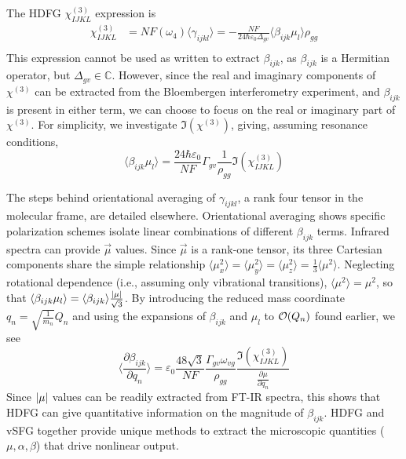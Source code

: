 \documentclass[aip, jcp, reprint, onecolumn]{revtex4-2}
\begin{document}
The HDFG $\chi^{(3)}_{IJKL}$ expression is
\begin{equation}\label{chi3}
\begin{split}
		\chi^{(3)}_{IJKL} &= NF(\omega_4) \langle \gamma_{ijkl} \rangle = -\frac{NF}{24 \hbar \varepsilon_0 \Delta_{gv}} \langle \beta_{ijk} \mu_l \rangle \rho_{gg}\\
\end{split}
\end{equation}
This expression cannot be used as written to extract $\beta_{ijk}$, as $\beta_{ijk}$ is a Hermitian operator, but $\Delta_{gv} \in \mathbb{C}$. 
However, since the real and imaginary components of $\chi^{(3)}$ can be extracted from the Bloembergen interferometry experiment, and $\beta_{ijk}$ is present in either term, we can choose to focus on the real or imaginary part of $\chi^{(3)}$.
For simplicity, we investigate $\Im(\chi^{(3)})$, giving, assuming resonance conditions, 
\begin{equation}
	\langle \beta_{ijk} \mu_{l} \rangle = \frac{24 \hbar \varepsilon_0}{NF} \Gamma_{gv} \frac{1}{\rho_{gg}} \Im(\chi^{(3)}_{IJKL})
\end{equation}

The steps behind orientational averaging of $\gamma_{ijkl}$, a rank four tensor in the molecular frame, are detailed elsewhere.\cite{Andrews1977, McDonnell2024}
Orientational averaging shows specific polarization schemes isolate linear combinations of different $\beta_{ijk}$ terms. 
Infrared spectra can provide $\vec{\mu}$ values.
Since $\vec{\mu}$ is a rank-one tensor, its three Cartesian components share the simple relationship $\langle {\mu^2_x} \rangle = \langle {\mu^2_y} \rangle = \langle {\mu^2_z} \rangle = \frac{1}{3}\langle {\mu^2} \rangle$. \cite{RN459}
Neglecting rotational dependence (i.e., assuming only vibrational transitions), $\langle {\mu^2} \rangle = \mu^2$, so that $\langle \beta_{ijk} \mu_l \rangle = \langle \beta_{ijk} \rangle \frac{\abs{\mu}}{\sqrt{3}}$.
By introducing the reduced mass coordinate $q_n = \sqrt{\frac{1}{m_n}} Q_n$ and using the expansions of $\beta_{ijk}$ and $\mu_{l}$ to $\order{Q_n}$ found earlier, we see
\begin{equation}\label{betasive}
	\langle \frac{\partial \beta_{ijk}}{\partial q_n} \rangle = \varepsilon_0 \frac{48 \sqrt{3} }{NF}  \frac{\Gamma_{gv} \omega_{vg}}{\rho_{gg}} \frac{\Im(\chi^{(3)}_{IJKL})}{\frac{\partial \mu}{\partial q_n}}
\end{equation}
Since $\abs{\mu}$ values can be readily extracted from FT-IR spectra,\cite{RN412} this shows that HDFG can give quantitative information on the magnitude of $\beta_{ijk}$.
HDFG and vSFG together provide unique methods to extract the microscopic quantities ($\mu, \alpha, \beta$) that drive nonlinear output.
\end{document}
